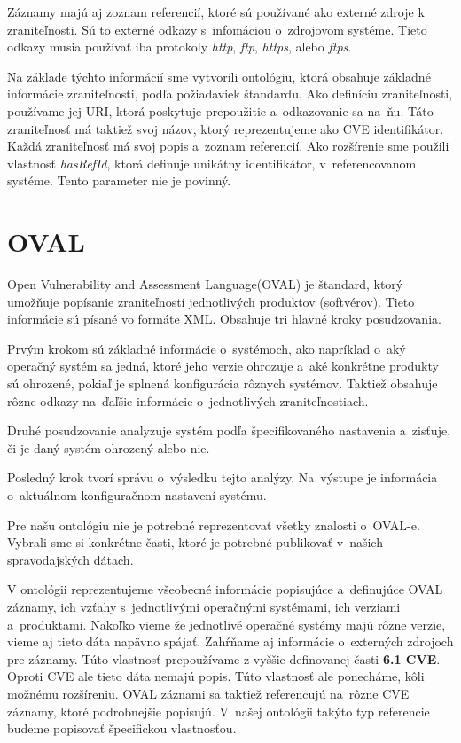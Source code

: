 \documentclass[12pt, a4paper, oneside]{book}
\begin{document}
Záznamy majú aj zoznam referencií, ktoré sú používané ako externé zdroje k zraniteľnosti. Sú to externé odkazy s~infomáciou o~zdrojovom systéme. Tieto odkazy musia používať iba protokoly \textit{http}, \textit{ftp}, \textit{https}, alebo \textit{ftps}.


Na základe týchto informácií sme vytvorili ontológiu, ktorá obsahuje základné informácie zraniteľnosti, podľa požiadaviek štandardu. Ako definíciu zraniteľnosti, používame jej URI, ktorá poskytuje prepoužitie a~odkazovanie sa na~ňu. Táto zraniteľnosť má taktiež svoj názov, ktorý reprezentujeme ako CVE identifikátor. Každá zraniteľnosť má svoj popis a~zoznam referencií. Ako rozšírenie sme použili vlastnosť \textit{hasRefId}, ktorá definuje unikátny identifikátor, v~referencovanom systéme. Tento parameter nie je povinný.




\section{OVAL}
Open Vulnerability and Assessment Language(OVAL) \citep{oval} je štandard, ktorý umožňuje popísanie zraniteľností jednotlivých produktov (softvérov). Tieto informácie sú písané vo formáte XML. Obsahuje tri hlavné kroky posudzovania.


Prvým krokom sú základné informácie o~systémoch, ako napríklad o~aký operačný systém sa jedná, ktoré jeho verzie ohrozuje a~aké konkrétne produkty sú ohrozené, pokiaľ je splnená konfigurácia rôznych systémov. Taktiež obsahuje rôzne odkazy na~ďaľšie informácie o~jednotlivých zraniteľnostiach. 


Druhé posudzovanie analyzuje systém podľa špecifikovaného nastavenia a~zisťuje, či je daný systém ohrozený alebo nie. 


Posledný krok tvorí správu o~výsledku tejto analýzy. Na~výstupe je informácia o~aktuálnom konfiguračnom nastavení systému.


Pre našu ontológiu nie je potrebné reprezentovať všetky znalosti o~OVAL-e. Vybrali sme si konkrétne časti, ktoré je potrebné publikovať v~našich spravodajských dátach. 


V ontológii reprezentujeme všeobecné informácie popisujúce a~definujúce OVAL záznamy, ich vzťahy s~jednotlivými operačnými systémami, ich verziami a~produktami. Nakoľko vieme že jednotlivé operačné systémy majú rôzne verzie, vieme aj tieto dáta napävno spájať. Zahŕňame aj informácie o~externých zdrojoch pre záznamy. Túto vlastnosť prepoužívame z vyššie definovanej časti \textbf{6.1 CVE}. Oproti CVE ale tieto dáta nemajú popis. Túto vlastnosť ale ponecháme, kôli možnému rozšíreniu. OVAL záznami sa taktiež referencujú na~rôzne CVE záznamy, ktoré podrobnejšie popisujú. V~našej ontológii takýto typ referencie budeme popisovať špecifickou vlastnosťou.
\end{document}
